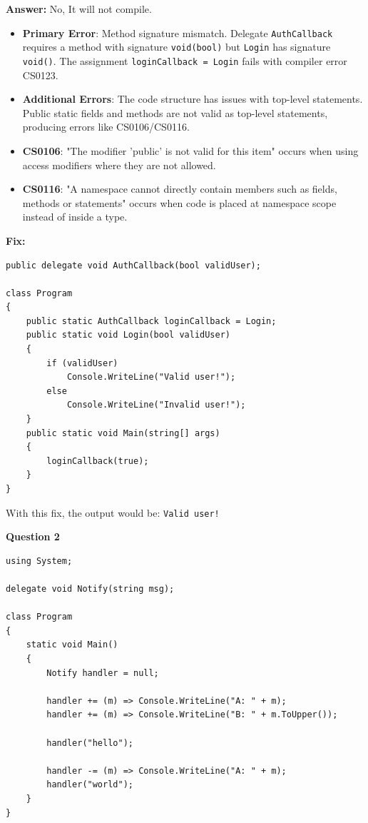 \textbf{Answer:} No, It will not compile.
\begin{itemize}
    \item \textbf{Primary Error}: Method signature mismatch. Delegate \texttt{AuthCallback} requires a method with signature \texttt{void(bool)} but \texttt{Login} has signature \texttt{void()}. The assignment \texttt{loginCallback = Login} fails with compiler error CS0123.
    \item \textbf{Additional Errors}: The code structure has issues with top-level statements. Public static fields and methods are not valid as top-level statements, producing errors like CS0106/CS0116.
    \item \textbf{CS0106}: "The modifier 'public' is not valid for this item" occurs when using access modifiers where they are not allowed.
    \item \textbf{CS0116}: "A namespace cannot directly contain members such as fields, methods or statements" occurs when code is placed at namespace scope instead of inside a type.
\end{itemize}

\textbf{Fix:}
\begin{lstlisting}[language=CSharp]
public delegate void AuthCallback(bool validUser);

class Program
{
    public static AuthCallback loginCallback = Login;
    public static void Login(bool validUser)
    {
        if (validUser)
            Console.WriteLine("Valid user!");
        else
            Console.WriteLine("Invalid user!");
    }
    public static void Main(string[] args)
    {
        loginCallback(true);
    }
}
\end{lstlisting}

With this fix, the output would be: \texttt{Valid user!}

\textbf{Question 2}

\begin{lstlisting}[language=CSharp, caption={Multicast Delegate Behavior}]
using System;

delegate void Notify(string msg);

class Program
{
    static void Main()
    {
        Notify handler = null;

        handler += (m) => Console.WriteLine("A: " + m);
        handler += (m) => Console.WriteLine("B: " + m.ToUpper());
        
        handler("hello");

        handler -= (m) => Console.WriteLine("A: " + m);
        handler("world");
    }
}
\end{lstlisting}

